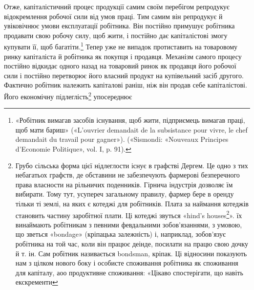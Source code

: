 Отже, капіталістичний процес продукції самим своїм перебігом
репродукує відокремлення робочої сили від умов праці.
Тим самим він репродукує й увіковічнює умови експлуатації
робітника. Він постійно примушує робітника продавати свою
робочу силу, щоб жити, і постійно дає капіталістові змогу купувати
її, щоб багатіти.\footnote{
«Робітник вимагав засобів існування, щоб жити, підприємець
вимагав праці, щоб мати бариш» («L’ouvrier demandait de la subsistance
pour vivre, le chef demandait du travail pour gagner»). («Sismondi: «Nouveaux
Principes d’Economie Politique», vol. I, p. 91).
} Тепер уже не випадок протиставить на
товаровому ринку капіталіста й робітника як покупця і продавця.
Механізм самого процесу постійно відкидає одного назад на
товаровий ринок як продавця його робочої сили і постійно перетворює
його власний продукт на купівельний засіб другого.
Фактично робітник належить капіталові раніш, ніж він продав
себе капіталістові. Його економічну підлеглість\footnote{
Грубо сільська форма цієї нідлеглости існує в графстві Дергем.
Це одно з тих небагатьох графств, де обставини не забезпечують фармерові
безперечного права власности на рільничих поденників. Гірнича
індустрія дозволяє їм вибирати. Тому тут, усупереч загальному правилу,
фармер бере в оренду тільки ті землі, на яких є котеджі для робітників.
Плата за наймання котеджів становить частину заробітної плати. Ці котеджі
звуться «hind’s houses\footnote*{
— доми слуг. Ред.
}». їх винаймають робітникам з певними февдальними
зобов’язаннями, з умовою, що зветься «bondage» (кріпацька
залежність) і, наприклад, зобов’язує робітника на той час, коли він працює
деінде, посилати на працю свою дочку й т. ін. Сам робітник називається
bondsman, кріпак. Ці відносини показують нам з цілком нового
боку і особисте споживання робітника як споживання для капіталу, аоо
продуктивне споживання: «Цікаво спостерігати, що навіть екскременти
} упосереднює
